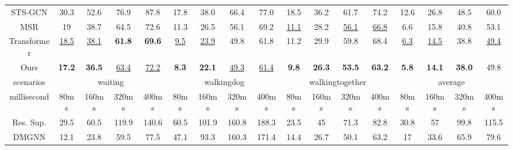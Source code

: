 \begin{table}[h]
{\begin{tabular}{c|cccc|cccc|cccc|cccc}
STS-GCN              & 30.3                 & 52.6                 & 76.9                 & 87.8                          & 17.8                 & 38.0                 & 66.4                 & 77.0                 & 18.5                 & 36.2                 & 61.7                 & 74.2                 & 12.6                 & 26.8                 & 48.5                 & 60.0\\
MSR   & 19            & 38.7          & 64.5          & 72.6          & 11.3          & 26.5          & 56.1          & 69.2           & \underline{11.1}          & 28.2          & \underline{56.1}          & \underline{66.8}          & 6.6           & 15.8          & 40.8          & 53.1          \\
Transformer & \underline{18.5}          & \underline{38.1}          & \textbf{61.8} & \textbf{69.6} & \underline{9.5}           & \underline{23.9}          & 49.8          & 61.8           & 11.2          & 29.9          & 59.8          & 68.4          & \underline{6.3}           & \underline{14.5}          & 38.8          & \underline{49.4}          \\
Ours   & \textbf{17.2} & \textbf{36.5} & \underline{63.4}          & \underline{72.2}          & \textbf{8.3}  & \textbf{22.1} & \underline{49.3} & \underline{61.4}  & \textbf{9.8}  & \textbf{26.3} & \textbf{53.5} & \textbf{63.2} & \textbf{5.8}  & \textbf{14.1} & \textbf{38.0} & 49.8 \\ \hline
scenarios   & \multicolumn{4}{c|}{waiting}                                   & \multicolumn{4}{c|}{walkingdog}                                 & \multicolumn{4}{c|}{walkingtogether}                           & \multicolumn{4}{c}{average}                                       \\ \hline
millisecond & 80ms          & 160ms         & 320ms         & 400ms         & 80ms          & 160ms         & 320ms         & 400ms          & 80ms          & 160ms         & 320ms         & 400ms         & 80ms          & 160ms         & 320ms         & 400ms         \\ \hline
Res. Sup.   & 29.5          & 60.5          & 119.9         & 140.6         & 60.5          & 101.9         & 160.8         & 188.3          & 23.5          & 45            & 71.3          & 82.8          & 30.8          & 57            & 99.8          & 115.5         \\
DMGNN       & 12.1          & 23.8          & 59.5          & 77.5          & 47.1          & 93.3          & 160.3         & 171.4          & 14.4          & 26.7          & 50.1          & 63.2          & 17            & 33.6          & 65.9          & 79.6          \\

\end{tabular}}
\end{table}

